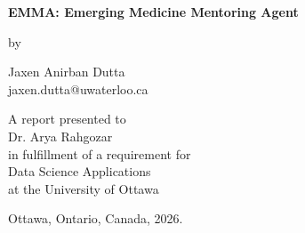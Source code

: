 \pagestyle{empty}

\begin{titlepage}
        \begin{center}
        \vspace*{0.5cm}

        \Huge
        {
        \bf 
        EMMA: Emerging Medicine Mentoring Agent \\
        }

        \vspace*{4cm}

        \normalsize
        by \\

        \vspace*{1.0cm}

        \Large
        Jaxen Anirban Dutta \\
        \normalsize
        jaxen.dutta@uwaterloo.ca \\

        \vspace*{2.5cm}

        A report presented to \\
        Dr. Arya Rahgozar \\ 
        in fulfillment of a requirement for \\
        Data Science Applications \\
        at the University of Ottawa \\

        \vspace*{1.25cm}

        Ottawa, Ontario, Canada, 2026. \\
        
        \end{center}
\end{titlepage}

\pagestyle{plain}
\setcounter{page}{2}

\cleardoublepage %

